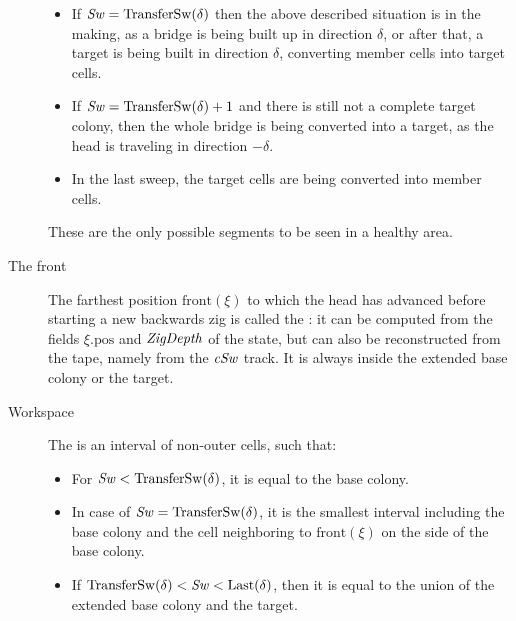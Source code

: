 \documentclass[12pt]{memoir}
\newcommand{\fld}[1]{\ensuremath{\textit{#1\/}}}
\newcommand{\pos}{\mathrm{pos}}
\newcommand{\Sweep}{\fld{Sw}}
\newcommand{\cSweep}{\fld{cSw}}
\newcommand{\ZigDepth}{\fld{ZigDepth}}
\newcommand{\front}{\mathrm{front}}
\newcommand{\Last}{\mathrm{Last}}
\newcommand{\TransferSw}{\mathrm{TransferSw}}
\begin{document}
\begin{definition}
\begin{description}
\begin{itemize}
  \item If \( \Sweep = \TransferSw(\delta) \) then the above 
    described situation is in the making, as
    a bridge is being built up in direction \( \delta \), or after that,
    a target is being built in direction \( \delta \), converting member cells into target cells.
          
  \item If \( \Sweep = \TransferSw(\delta) +1 \) and there is still not a complete target colony,
    then the whole bridge is being converted into a target, 
    as the head is traveling in direction \( -\delta \).
    
  \item In the last sweep, the target cells are being converted into member cells.
  \end{itemize}
  These are the only possible segments to be seen in a healthy area.
        
    \item [The front] 
      The farthest position \( \front(\xi) \) to which the head has 
      advanced before starting a new backwards zig is called the :
      it can be computed from the fields \( \xi.\pos \) and \( \ZigDepth \) of the state, 
      but can also be reconstructed from the tape, namely from the \( \cSweep \) track.
      It is always inside the extended base colony or the target.

     \item[Workspace]

       \begin{sloppypar}
          The  is an interval of non-outer cells, such that:         
        \end{sloppypar}
        
        \begin{itemize}
        
        \item For \( \Sweep < \TransferSw(\delta) \), it is equal to the base colony.

        \item In case of \( \Sweep = \TransferSw(\delta) \), it is the smallest interval including
              the base colony and the cell neighboring to \( \front(\xi) \) on the side of the base colony.

        \item If \( \TransferSw(\delta) < \Sweep < \Last(\delta) \),
              then it is equal to the union of the extended base colony and the target.


\end{itemize}
\end{description}
\end{definition}
\end{document}
